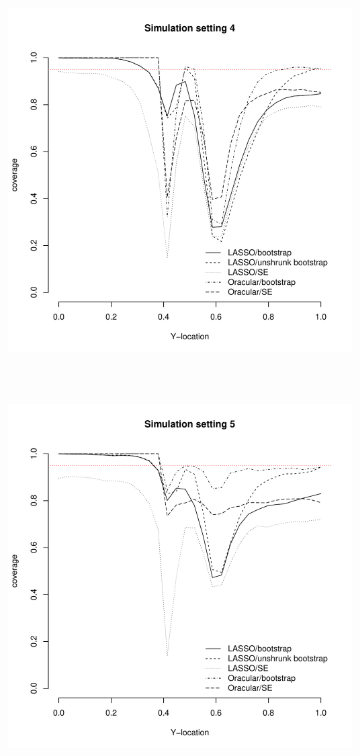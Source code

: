 \documentclass[authoryear, review, 11pt]{elsarticle}
\begin{document}
	
	\begin{figure}
		\centering
		\begin{subfigure}[b]{0.3\textwidth}
			\centering
			\includegraphics[width=\textwidth]{../../figures/simulation/28-4-profile-coverage.pdf}
			\label{fig:gull}
		\end{subfigure}%
        ~ %
		\begin{subfigure}[b]{0.3\textwidth}
			\centering
			\includegraphics[width=\textwidth]{../../figures/simulation/28-5-profile-coverage.pdf}

\end{subfigure}
\end{figure}
\end{document}
